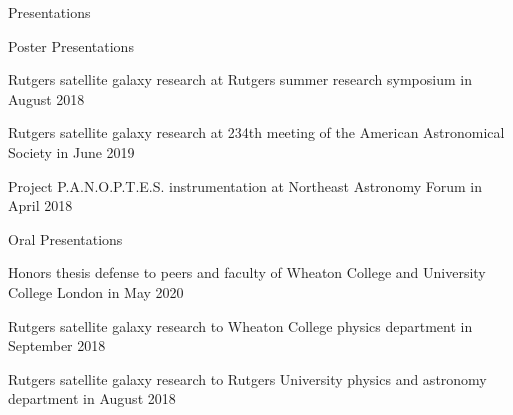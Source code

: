 \documentclass{resume} %
\begin{document}
\begin{rSection}{Presentations}
\begin{rSubsection}{Poster Presentations}{}{}{}
\item Rutgers satellite galaxy research at Rutgers summer research symposium in August 2018
\item Rutgers satellite galaxy research at 234th meeting of the American Astronomical Society in June 2019
\item Project P.A.N.O.P.T.E.S. instrumentation at Northeast Astronomy Forum in April 2018
\end{rSubsection}
\begin{rSubsection}{Oral Presentations}{}{}{}
\item Honors thesis defense to peers and faculty of Wheaton College and University College London in May 2020
\item Rutgers satellite galaxy research to Wheaton College physics department in September 2018
\item Rutgers satellite galaxy research to Rutgers University physics and astronomy department in August 2018
\end{rSubsection}
\end{rSection}
\end{document}
